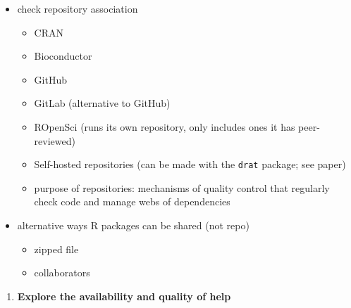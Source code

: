 \documentclass[10pt,letterpaper]{article}
\providecommand{\tightlist}{%
  \setlength{\itemsep}{0pt}\setlength{\parskip}{0pt}}
\begin{document}
\begin{itemize}
\tightlist
\item
  check repository association

  \begin{itemize}
  \tightlist
  \item
    CRAN
  \item
    Bioconductor
  \item
    GitHub
  \item
    GitLab (alternative to GitHub)
  \item
    ROpenSci (runs its own repository, only includes ones it has
    peer-reviewed)
  \item
    Self-hosted repositories (can be made with the \texttt{drat}
    package; see paper)
  \item
    purpose of repositories: mechanisms of quality control that
    regularly check code and manage webs of dependencies
  \end{itemize}
\item
  alternative ways R packages can be shared (not repo)

  \begin{itemize}
  \tightlist
  \item
    zipped file
  \item
    collaborators
  \end{itemize}
\end{itemize}

\begin{enumerate}
\def\labelenumi{\arabic{enumi}.}
\setcounter{enumi}{3}
\tightlist
\item
  \textbf{Explore the availability and quality of help}
\end{enumerate}
\end{document}
